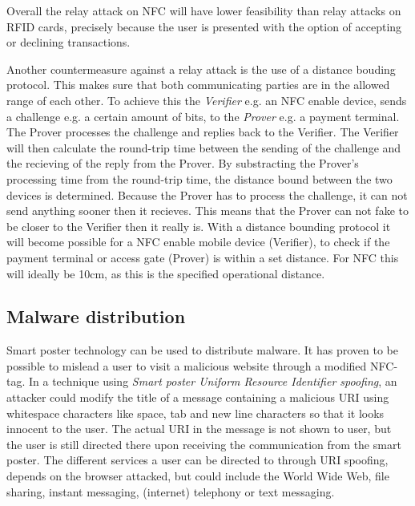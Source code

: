 Overall the relay attack on NFC will have lower feasibility than relay attacks on RFID cards, precisely because the user is presented with the option of accepting or declining transactions.

Another countermeasure against a relay attack is the use of a distance bouding protocol. This makes sure that both communicating parties are in the allowed range of each other. To achieve this the \textit{Verifier} e.g. an NFC enable device, sends a challenge e.g. a certain amount of bits, to the \textit{Prover} e.g. a payment terminal. The Prover processes the challenge and replies back to the Verifier. The Verifier will then calculate the round-trip time between the sending of the challenge and the recieving of the reply from the Prover. By substracting the Prover's processing time from the round-trip time, the distance bound between the two devices is determined. 
Because the Prover has to process the challenge, it can not send anything sooner then it recieves. This means that the Prover can not fake to be closer to the Verifier then it really is.
With a distance bounding protocol it will become possible for a NFC enable mobile device (Verifier), to check if the payment terminal or access gate (Prover) is within a set distance. For NFC this will ideally be 10cm, as this is the specified operational distance. \cite{rasmussenrealization,brands1994distance}



\subsection{Malware distribution}
Smart poster technology can be used to distribute malware.
It has proven to be possible to mislead a user to visit a malicious website through a modified NFC-tag.
In a technique using \textit{Smart poster Uniform Resource Identifier spoofing}, an attacker could modify the title of a message containing a malicious URI using whitespace characters like space, tab and new line characters so that it looks innocent to the user.
The actual URI in the message is not shown to user, but the user is still directed there upon receiving the communication from the smart poster.
The different services a user can be directed to through URI spoofing, depends on the browser attacked, but could include the World Wide Web, file sharing, instant messaging, (internet) telephony or text messaging.

